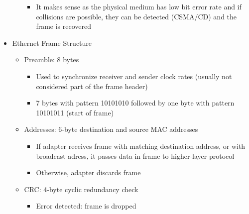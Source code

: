 \begin{itemize}
\begin{itemize}
\begin{itemize}
\begin{itemize}
            \end{itemize}

          \item It makes sense as the physical medium has low bit error rate and if collisions are possible, they can be detected (CSMA/CD) and the frame is recovered

        \end{itemize}

    \end{itemize}

  \item Ethernet Frame Structure

    \begin{itemize}

      \item Preamble: 8 bytes

        \begin{itemize}

          \item Used to synchronize receiver and sender clock rates (usually not considered part of the frame header)

          \item 7 bytes with pattern 10101010 followed by one byte with pattern 10101011 (start of frame)

        \end{itemize}

      \item Addresses: 6-byte destination and source MAC addresses

        \begin{itemize}

          \item If adapter receives frame with matching destination address, or with broadcast adress, it passes data in frame to higher-layer protocol

          \item Otherwise, adapter discards frame

        \end{itemize}

      \item CRC: 4-byte cyclic redundancy check

        \begin{itemize}

          \item Error detected: frame is dropped

        \end{itemize}


\end{itemize}
\end{itemize}
